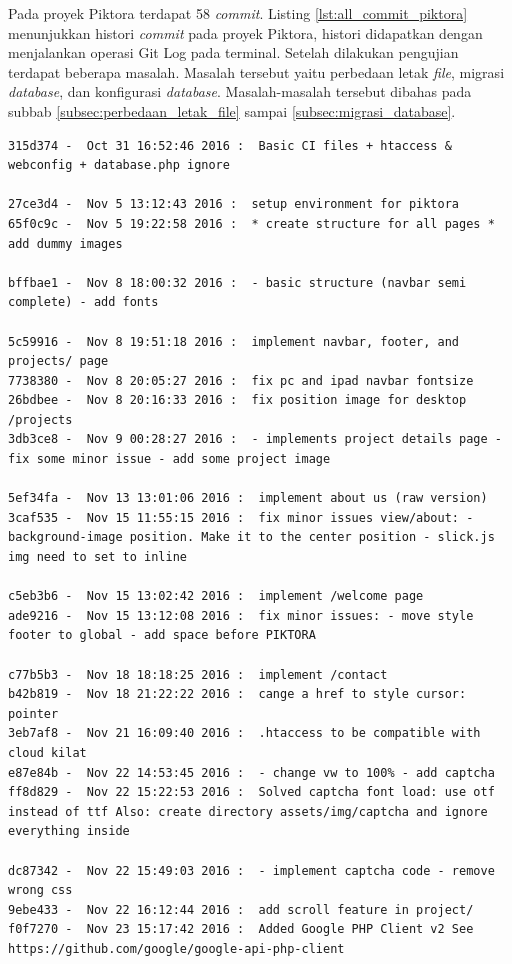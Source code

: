Pada proyek Piktora terdapat 58 \textit{commit}. Listing \ref{lst:all_commit_piktora} menunjukkan histori \textit{commit} pada proyek Piktora, histori didapatkan dengan menjalankan operasi Git Log pada terminal. Setelah dilakukan pengujian terdapat beberapa masalah. Masalah tersebut yaitu perbedaan letak \textit{file}, migrasi \textit{database}, dan konfigurasi \textit{database}. Masalah-masalah tersebut dibahas pada subbab \ref{subsec:perbedaan_letak_file} sampai \ref{subsec:migrasi_database}.

\begin{lstlisting}[caption={Histori \textit{commit} pada proyek Piktora},label={lst:all_commit_piktora},language=plaintext]
315d374 -  Oct 31 16:52:46 2016 :  Basic CI files + htaccess & webconfig + database.php ignore

27ce3d4 -  Nov 5 13:12:43 2016 :  setup environment for piktora
65f0c9c -  Nov 5 19:22:58 2016 :  * create structure for all pages * add dummy images

bffbae1 -  Nov 8 18:00:32 2016 :  - basic structure (navbar semi complete) - add fonts

5c59916 -  Nov 8 19:51:18 2016 :  implement navbar, footer, and projects/ page
7738380 -  Nov 8 20:05:27 2016 :  fix pc and ipad navbar fontsize
26bdbee -  Nov 8 20:16:33 2016 :  fix position image for desktop /projects
3db3ce8 -  Nov 9 00:28:27 2016 :  - implements project details page - fix some minor issue - add some project image

5ef34fa -  Nov 13 13:01:06 2016 :  implement about us (raw version)
3caf535 -  Nov 15 11:55:15 2016 :  fix minor issues view/about: - background-image position. Make it to the center position - slick.js img need to set to inline

c5eb3b6 -  Nov 15 13:02:42 2016 :  implement /welcome page
ade9216 -  Nov 15 13:12:08 2016 :  fix minor issues: - move style footer to global - add space before PIKTORA

c77b5b3 -  Nov 18 18:18:25 2016 :  implement /contact
b42b819 -  Nov 18 21:22:22 2016 :  cange a href to style cursor: pointer
3eb7af8 -  Nov 21 16:09:40 2016 :  .htaccess to be compatible with cloud kilat
e87e84b -  Nov 22 14:53:45 2016 :  - change vw to 100% - add captcha
ff8d829 -  Nov 22 15:22:53 2016 :  Solved captcha font load: use otf instead of ttf Also: create directory assets/img/captcha and ignore everything inside

dc87342 -  Nov 22 15:49:03 2016 :  - implement captcha code - remove wrong css
9ebe433 -  Nov 22 16:12:44 2016 :  add scroll feature in project/
f0f7270 -  Nov 23 15:17:42 2016 :  Added Google PHP Client v2 See https://github.com/google/google-api-php-client


\end{lstlisting}
